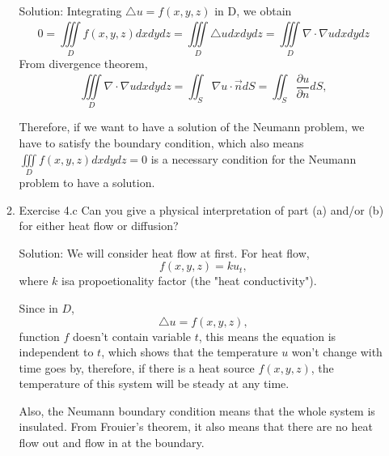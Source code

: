 \documentclass{article}
\begin{document}
\begin{enumerate}
\begin{enumerate}
		Solution: Integrating $\triangle u = f(x,y,z)$ in D, we obtain
		\[0= \iiint\limits_{D}^{} f(x,y,z)dxdydz=\iiint\limits_{D}^{} \triangle u dxdydz=\iiint\limits_{D}^{} \nabla \cdot \nabla u dxdydz
		\]
		From divergence theorem,
		\[\iiint\limits_{D}^{} \nabla \cdot \nabla u dxdydz=\iint_{S}^{} \nabla u \cdot \vec{n}dS=\iint_{S}^{} \frac{\partial u}{\partial n}dS,
			\]

			Therefore, if we want to have a solution of the Neumann problem, we have to satisfy the boundary condition, which also means $ \iiint\limits_{D}^{} f(x,y,z)dxdydz=0$ is a necessary condition for the Neumann problem to have a solution.
		\item Exercise 4.c Can you give a physical interpretation of part (a) and/or (b) for either heat flow or diffusion?
		
		Solution: We will consider heat flow at first. For heat flow, \[f(x,y,z)=ku_{t},\]
		where $k$ isa propoetionality factor (the "heat conductivity").
        
		Since in $D$, \[\triangle u = f(x,y,z),\] function $f$ doesn't contain variable $t$, this means the equation is independent to $t$, which shows that the temperature $u$ won't change with time goes by, therefore, if there is a heat source $f(x,y,z)$, the temperature of this system will be steady at any time.

		Also, the Neumann boundary condition means that the whole system is insulated. From Frouier's theorem, it also means that there are no heat flow out and flow in at the boundary.

		
	\end{enumerate}
\end{enumerate}
\end{document}
